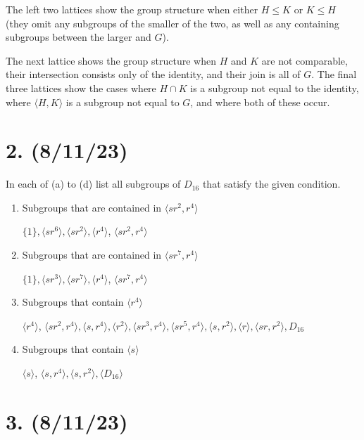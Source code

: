 \documentclass{article}
\begin{document}
\vspace{0.5cm}

The left two lattices show the group structure when either $H \leq K$ or $K \leq H$ (they omit any subgroups of the smaller of the two, as well as any containing subgroups between the larger and $G$).

The next lattice shows the group structure when $H$ and $K$ are not comparable, their intersection consists only of the identity, and their join is all of $G$. The final three lattices show the cases where $H \cap K$ is a subgroup not equal to the identity, where $\langle H, K \rangle$ is a subgroup not equal to $G$, and where both of these occur.

\section*{2. (8/11/23)}

In each of (a) to (d) list all subgroups of $D_{16}$ that satisfy the given condition.

\begin{enumerate}[label=(\alph*), itemsep=0em]
    \item Subgroups that are contained in $\langle sr^2, r^4 \rangle$

          $\{ 1 \}, \langle sr^6 \rangle, \langle sr^2 \rangle, \langle r^4 \rangle$, $\langle sr^2, r^4 \rangle$
    \item Subgroups that are contained in $\langle sr^7, r^4 \rangle$

        $\{ 1 \}, \langle sr^3 \rangle, \langle sr^7 \rangle, \langle r^4 \rangle$, $\langle sr^7, r^4 \rangle$
    \item Subgroups that contain $\langle r^4 \rangle$

        $\langle r^4 \rangle$, $\langle sr^2, r^4 \rangle, \langle s, r^4 \rangle, \langle r^2 \rangle, \langle sr^3, r^4 \rangle, \langle sr^5, r^4 \rangle, \langle s, r^2 \rangle, \langle r \rangle, \langle sr, r^2 \rangle, D_{16}$
    \item Subgroups that contain $\langle s \rangle$

        $\langle s \rangle$, $\langle s, r^4 \rangle, \langle s, r^2 \rangle, \langle D_{16} \rangle$
\end{enumerate}

\section*{3. (8/11/23)}
\end{document}
